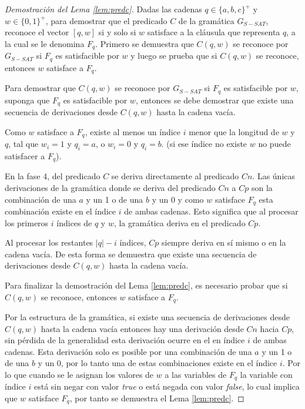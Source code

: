 \documentclass[12pt]{article}
\newcommand{\true}{\textit{true}}
\newcommand{\false}{\textit{false}}
\begin{document}
\begin{proof}[Demostración del Lema \ref{lem:predc}]
    Dadas las cadenas $q\in \{a,b,c\}^+$ y $w\in \{0,1\}^+$, para demostrar que el predicado $C$ de la 
    gramática $G_{S-SAT}$, reconoce el vector $[q,w]$ si y solo si $w$ satisface a la cláusula que representa 
    $q$, a la cual se le denomina $F_q$. Primero se demuestra que $C(q,w)$ se reconoce por $G_{S-SAT}$ si $F_q$ es satisfacible por $w$ y 
    luego se prueba que si $C(q,w)$ se reconoce, entonces $w$ satisface a $F_q$.
    
    Para demostrar que $C(q,w)$ se reconoce por $G_{S-SAT}$ si $F_q$ es satisfacible por $w$, suponga que $F_q$ es satisfacible por $w$, entonces se debe demostrar que existe una secuencia de derivaciones desde $C(q,w)$ hasta la cadena vacía.
    
    Como $w$ satisface a $F_q$, existe al menos un índice $i$ menor que la longitud de $w$ y $q$, tal que $w_i=1$ y $q_i = a$, o $w_i=0$ y $q_i=b$. (si ese índice no existe $w$ no puede satisfacer a $F_q$).
    
    En la fase 4, del predicado $C$ se deriva directamente al predicado $Cn$. Las únicas derivaciones de la gramática donde se deriva del predicado $Cn$ a $Cp$ son la combinación de una $a$ y un 1 o de una $b$ y un 0 y como $w$ satisface $F_q$ esta combinación existe en el índice $i$ de ambas cadenas. Esto significa que al procesar los primeros $i$ índices de $q$ y $w$, la gramática deriva en el predicado $Cp$. 
    
    Al procesar los restantes $|q|-i$ índices, $Cp$ siempre deriva en sí mismo o en la cadena vacía. De esta forma se demuestra que existe una secuencia de derivaciones desde $C(q,w)$ hasta la cadena vacía.
    
    Para finalizar la demostración del Lema \ref{lem:predc}, es necesario probar que si $C(q,w)$ se reconoce, entonces $w$ satisface a $F_q$. 
    
    Por la estructura de la gramática, si existe una secuencia de derivaciones desde $C(q,w)$ hasta la cadena vacía entonces hay una derivación desde $Cn$ hacia $Cp$, sin pérdida de la generalidad esta derivación ocurre en el en índice $i$ de ambas cadenas. Esta derivación solo es posible por una combinación de una $a$ y un 1 o de una $b$ y un 0, por lo tanto una de estas combinaciones existe en el índice $i$. Por lo que cuando se le asignan los valores de $w$ a las variables de $F_q$ la variable con índice $i$ está
    sin negar con valor \true{} o está negada con valor \false{}, lo cual implica que $w$ satisface $F_q$, por tanto se demuestra el Lema \ref{lem:predc}.
\end{proof}
\end{document}
